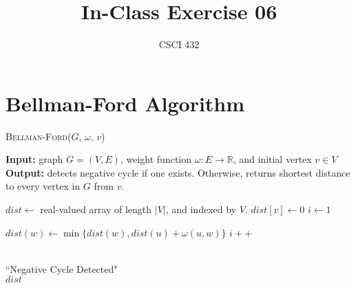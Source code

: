 \documentclass{article}
\title{In-Class Exercise 06}
\author{CSCI 432}
\def\R{{\mathbb R}}
\begin{document}
\maketitle

\section*{Bellman-Ford Algorithm}
\begin{algorithm}\caption{\textsc{Bellman-Ford}($G$, $\omega$, $v$)}\label{alg:seb}
    {\bf Input:} graph $G=(V,E)$, weight function $\omega \colon E \to \R$, and initial vertex $v \in V$ \\
    {\bf Output:} detects negative cycle if one exists.  Otherwise, returns
    shortest distance to every vertex in $G$ from $v$.\\
    \begin{algorithmic}[1]
        \State $dist \gets$ real-valued array of length $|V|$, and indexed by $V$.
        \State $dist[v] \gets 0$
        \State $i \gets 1$

                \State $dist(w) \gets \min \{ dist(w), dist(u)+ \omega(u,w) \}$
            \EndFor
            \State $i++$
        \EndWhile

            \\
                \quad\quad\quad \Return ``Negative Cycle Detected"
            \EndIf
        \EndFor\\
        \Return $dist$
    \end{algorithmic}
\end{algorithm}
\end{document}

